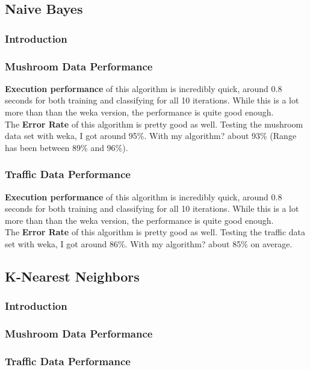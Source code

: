 \documentclass{article}
\begin{document}
\subsection{Naive Bayes}
\subsubsection{Introduction}
\subsubsection{Mushroom Data Performance}
\textbf{Execution performance} of this algorithm is incredibly quick, around 0.8 seconds for both training and classifying for all 10 iterations.  While this is a lot more than than the weka version, the performance is quite good enough.\\
The \textbf{Error Rate} of this algorithm is pretty good as well.  Testing the mushroom data set with weka, I got around 95\%.  With my algorithm? about 93\% (Range has been between 89\% and 96\%).
\subsubsection{Traffic Data Performance}
\textbf{Execution performance} of this algorithm is incredibly quick, around 0.8 seconds for both training and classifying for all 10 iterations.  While this is a lot more than than the weka version, the performance is quite good enough.\\
The \textbf{Error Rate} of this algorithm is pretty good as well.  Testing the traffic data set with weka, I got around 86\%.  With my algorithm? about 85\% on average.
\subsection{K-Nearest Neighbors}
\subsubsection{Introduction}
\subsubsection{Mushroom Data Performance}
\subsubsection{Traffic Data Performance}
\end{document}
